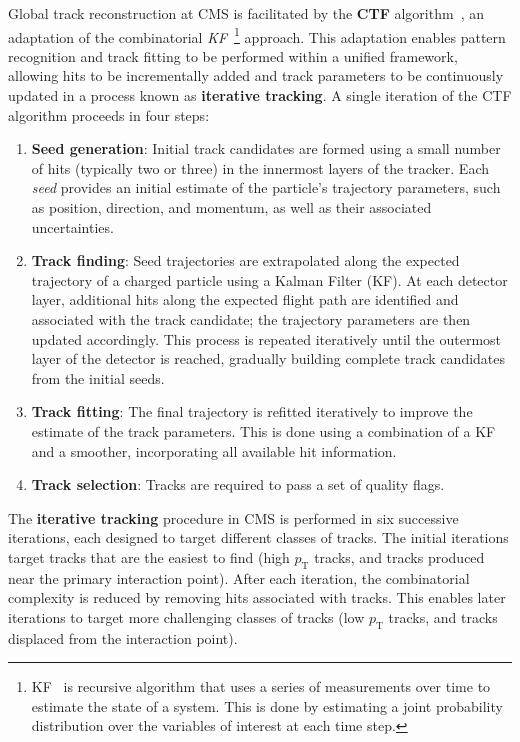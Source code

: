 Global track reconstruction at CMS is facilitated by the \textbf{\ac{CTF}} algorithm~\cite{CMS_TrackerPerformance_2014,CMS_Track_Reconstruction_Run2_3}, an adaptation of the combinatorial \textit{\ac{KF}}~\cite{KF_1,KF_2,KF_3}\footnote{KF~\cite{KF_4} is recursive algorithm that uses a series of measurements over time to estimate the state of a system. This is done by estimating a joint probability distribution over the variables of interest at each time step.} approach. This adaptation enables pattern recognition and track fitting to be performed within a unified framework, allowing hits to be incrementally added and track parameters to be continuously updated in a process known as \textbf{iterative tracking}. A single iteration of the CTF algorithm proceeds in four steps:

\begin{enumerate}
    \item \textbf{Seed generation}: Initial track candidates are formed using a small number of hits (typically two or three) in the innermost layers of the tracker. Each \textit{seed} provides an initial estimate of the particle's trajectory parameters, such as position, direction, and momentum, as well as their associated uncertainties. 
    \item \textbf{Track finding}: Seed trajectories are extrapolated along the expected trajectory of a charged particle using a Kalman Filter (KF). At each detector layer, additional hits along the expected flight path are identified and associated with the track candidate; the trajectory parameters are then updated accordingly. This process is repeated iteratively until the outermost layer of the detector is reached, gradually building complete track candidates from the initial seeds.
    \item \textbf{Track fitting}: The final trajectory is refitted iteratively to improve the estimate of the track parameters. This is done using a combination of a KF and a smoother, incorporating all available hit information.
    \item \textbf{Track selection}: Tracks are required to pass a set of quality flags.
\end{enumerate}

The \textbf{iterative tracking} procedure in CMS is performed in six successive iterations, each designed to target different classes of tracks. The initial iterations target tracks that are the easiest to find (\eg high $p_\mathrm{T}$ tracks, and tracks produced near the primary interaction point). After each iteration, the combinatorial complexity is reduced by removing hits associated with tracks. This enables later iterations to target more challenging classes of tracks (\eg low $p_\mathrm{T}$ tracks, and tracks displaced from the interaction point). 

